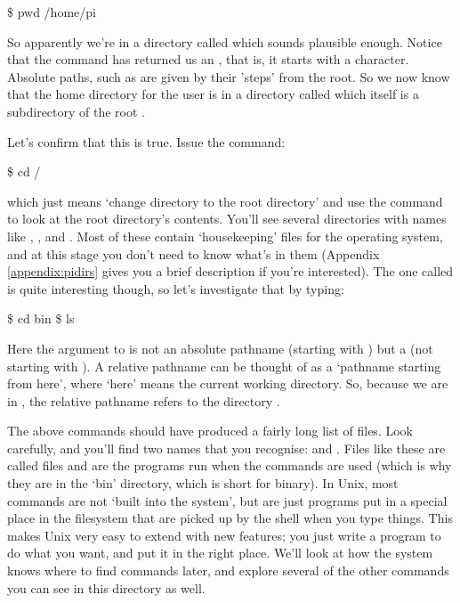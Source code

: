 \begin{ttoutenv}
\$ pwd
/home/pi
\end{ttoutenv}

So apparently we're in a directory called  which sounds plausible enough. Notice that the  command has returned us an , that is, it starts with a \fname{/} character. Absolute paths, such as  are given by their 'steps' from the root. So we now know that the home directory for the user  is in a directory called  which itself is a subdirectory of the root \fname{/}.

Let's confirm that this is true. Issue the command:
\begin{ttoutenv}
\$ cd /
\end{ttoutenv}

which just means `change directory to the root directory' and use the  command to look at the root directory's contents. You'll see several directories with names like , ,  and . Most of these contain `housekeeping' files for the operating system, and at this stage you don't need to know what's in them (Appendix \ref{appendix:pidirs} gives you a brief description if you're interested). The one called  is quite interesting though, so let's investigate that by typing:

\begin{ttoutenv}
\$ cd bin
\$ ls
\end{ttoutenv}

\noindent Here the argument to  is not an absolute pathname (starting with \ttout{/}) but a  (not starting with \ttout{/}). A relative pathname can be thought of as a `pathname starting from here', where `here' means the current working directory. So, because we are in \fname{/}, the relative pathname  refers to the directory .

\noindent The above commands should have produced  a fairly long list of files. Look carefully, and you'll find two names that you recognise:  and . Files like these are called  files and are the programs run when the commands are used  (which is why they are in the `bin' directory, which is short for binary). In Unix, most commands are not `built into the system', but are just programs put in a special place in the filesystem that are picked up by the shell when you type things. This makes Unix very easy to extend with new features; you just write a program to do what you want, and put it in the right place. We'll look at how the system knows where to find commands later, and explore several of the other commands you can see in this directory as well.

